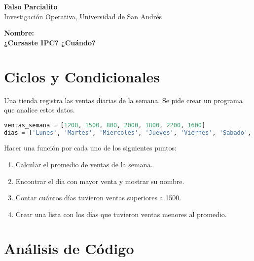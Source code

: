 \documentclass[12pt]{article}
\begin{document}
\begin{center}
  {\LARGE \textbf{Falso Parcialito}}\\[0.5em]
  {Investigación Operativa, Universidad de San Andrés}
\end{center}

\textbf{Nombre:} \dotuline{\hspace{\fill}} \\
\textbf{¿Cursaste IPC? ¿Cuándo?} \dotuline{\hspace{\fill}}

\section{Ciclos y Condicionales}

Una tienda registra las ventas diarias de la semana. Se pide crear un programa que analice estos datos.

\begin{lstlisting}[language=Python]
ventas_semana = [1200, 1500, 800, 2000, 1800, 2200, 1600]
dias = ['Lunes', 'Martes', 'Miercoles', 'Jueves', 'Viernes', 'Sabado', 'Domingo']
\end{lstlisting}

Hacer una función por cada uno de los siguientes puntos:
\begin{enumerate}[label=\alph*)]
    \item Calcular el promedio de ventas de la semana.
    \item Encontrar el día con mayor venta y mostrar su nombre.
    \item Contar cuántos días tuvieron ventas superiores a 1500.
    \item Crear una lista con los días que tuvieron ventas menores al promedio.
\end{enumerate}

\section{Análisis de Código}
\end{document}
